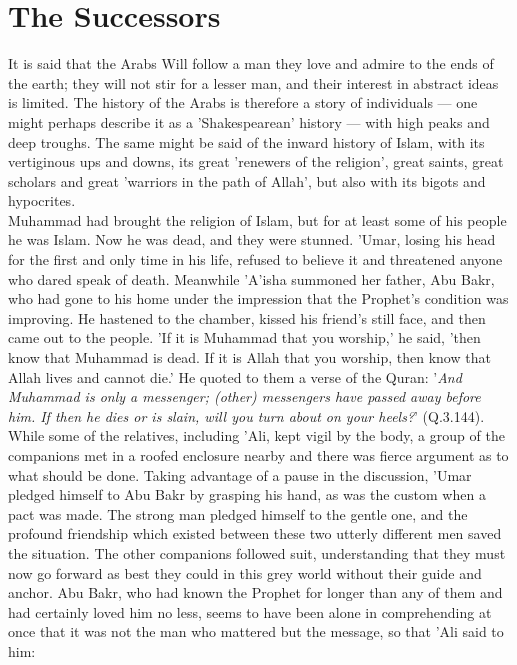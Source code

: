 \documentclass[10pt, twoside]{book}
\begin{document}
\chapter{The Successors}

It is said that the Arabs Will follow a man they love and admire to the ends of the earth; they will not stir for a lesser man, and their interest in abstract ideas is limited. The history of the Arabs is therefore a story of individuals --- one might perhaps describe it as a 'Shakespearean' history --- with high peaks and deep troughs. The same might be said of the inward history of Islam, with its vertiginous ups and downs, its great 'renewers of the religion', great saints, great scholars and great 'warriors in the path of Allah', but also with its bigots and hypocrites. \\

Muhammad had brought the religion of Islam, but for at least some of his people he was Islam. Now he was dead, and they were stunned. 'Umar, losing his head for the first and only time in his life, refused to believe it and threatened anyone who dared speak of death. Meanwhile 'A'isha summoned her father, Abu Bakr, who had gone to his home under the impression that the Prophet's condition was improving. He hastened to the chamber, kissed his friend's still face, and then came out to the people. 'If it is Muhammad that you worship,' he said, 'then know that Muhammad is dead. If it is Allah that you worship, then know that Allah lives and cannot die.' He quoted to them a verse of the Quran: '\emph{And Muhammad is only a messenger; (other) messengers have passed away before him. If then he dies or is slain, will you turn about on your heels?}' (Q.3.144). \\

While some of the relatives, including 'Ali, kept vigil by the body, a group of the companions met in a roofed enclosure nearby and there was fierce argument as to what should be done. Taking advantage of a pause in the discussion, 'Umar pledged himself to Abu Bakr by grasping his hand, as was the custom when a pact was made. The strong man pledged himself to the gentle one, and the profound friendship which existed between these two utterly different men saved the situation. The other companions followed suit, understanding that they must now go forward as best they could in this grey world without their guide and anchor. Abu Bakr, who had known the Prophet for longer than any of them and had certainly loved him no less, seems to have been alone in comprehending at once that it was not the man who mattered but the message, so that 'Ali said to him: \\
\end{document}
